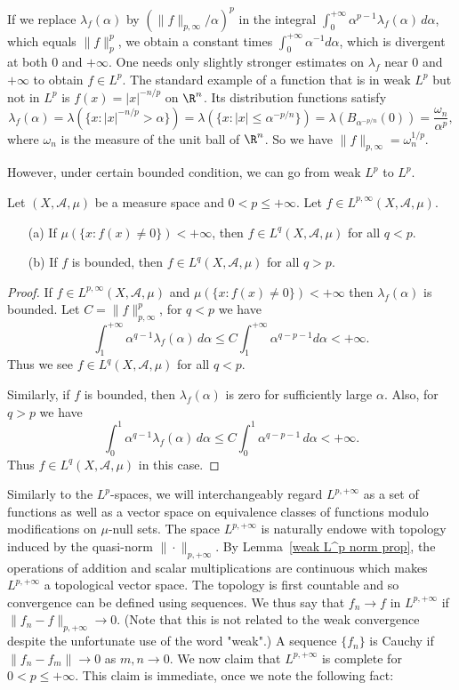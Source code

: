 If we replace $\lambda_f(\alpha)$ by $(\|f\|_{p,\infty}/\alpha)^p$ in the integral $\int_{0}^{+\infty}\alpha^{p-1}\lambda_f(\alpha)\,d\alpha$, which equals $\|f\|_p^p$, we obtain a constant times $\int_{0}^{+\infty}\alpha^{-1}d\alpha$, which is divergent at both $0$ and $+\infty$. One needs only slightly stronger estimates on $\lambda_f$ near $0$ and $+\infty$ to obtain
$f\in L^p$. The standard example of a function that is in weak $L^p$ but not in $L^p$ is $f(x)=|x|^{-n/p}$ on $\R^n$. Its distribution functions satisfy
\[\lambda_f(\alpha)=\lambda(\{x:|x|^{-n/p}>\alpha\})=\lambda(\{x:|x|\leq\alpha^{-p/n}\})=\lambda(B_{\alpha^{-p/n}}(0))=\frac{\omega_n}{\alpha^{p}},\]
where $\omega_n$ is the measure of the unit ball of $\R^n$. So we have $\|f\|_{p,\infty}=\omega_n^{1/p}$.\par
However, under certain bounded condition, we can go from weak $L^p$ to $L^p$.
\begin{proposition}\label{weak L^p is L^p if}
Let $(X,\mathcal{A},\mu)$ be a measure space and $0<p\leq+\infty$. Let $f\in L^{p,\infty}(X,\mathcal{A},\mu)$.
\begin{itemize}
\item[(a)] If $\mu(\{x:f(x)\neq 0\})<+\infty$, then $f\in L^{q}(X,\mathcal{A},\mu)$ for all $q<p$.
\item[(b)] If $f$ is bounded, then $f\in L^q(X,\mathcal{A},\mu)$ for all $q>p$.
\end{itemize} 
\end{proposition}
\begin{proof}
If $f\in L^{p,\infty}(X,\mathcal{A},\mu)$ and $\mu(\{x:f(x)\neq 0\})<+\infty$ then $\lambda_f(\alpha)$ is bounded. Let $C=\|f\|_{p,\infty}^p$, for $q<p$ we have
\[\int_{1}^{+\infty}\alpha^{q-1}\lambda_f(\alpha)\,d\alpha\leq C\int_{1}^{+\infty}\alpha^{q-p-1}d\alpha<+\infty.\]
Thus we see $f\in L^q(X,\mathcal{A},\mu)$ for all $q<p$.\par
Similarly, if $f$ is bounded, then $\lambda_f(\alpha)$ is zero for sufficiently large $\alpha$. Also, for $q>p$ we have
\[\int_{0}^{1}\alpha^{q-1}\lambda_f(\alpha)\,d\alpha\leq C\int_{0}^{1}\alpha^{q-p-1}\,d\alpha<+\infty.\]
Thus $f\in L^q(X,\mathcal{A},\mu)$ in this case.
\end{proof}
Similarly to the $L^p$-spaces, we will interchangeably regard $L^{p,+\infty}$ as a set of functions as well as a vector space on equivalence classes of functions modulo modifications on $\mu$-null sets. The space $L^{p,+\infty}$ is naturally endowe with topology induced by the quasi-norm $\|\cdot\|_{p,+\infty}$. By Lemma~\ref{weak L^p norm prop}, the operations of addition and scalar multiplications are continuous which makes $L^{p,+\infty}$ a topological vector space. The topology is first countable and so convergence can be defined using sequences. We thus say that $f_n\to f$ in $L^{p,+\infty}$ if $\|f_n-f\|_{p,+\infty}\to 0$. (Note that this is not related to the weak convergence despite the unfortunate use of the word "weak".) A sequence $\{f_n\}$ is Cauchy if $\|f_n-f_m\|\to 0$ as $m,n\to 0$. We now claim that $L^{p,+\infty}$ is complete for $0<p\leq+\infty$. This claim is immediate, once we note the following fact:
